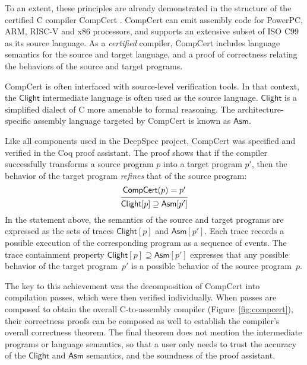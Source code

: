 \documentclass[11pt,oneside,draft]{book}
\theoremstyle{definition}
\newcommand{\kw}[1]{\ensuremath{ \mathsf{#1} }}
\begin{document}
To an extent,
these principles are already demonstrated in the structure of the
certified C compiler CompCert \citep{compcert}.
CompCert can emit assembly code
for PowerPC, ARM, RISC-V and x86 processors,
and supports an extensive subset of ISO C99
as its source language.
As a \emph{certified} compiler,
CompCert includes
language semantics for the source and target language,
and a proof of correctness relating the behaviors of
the source and target programs.

CompCert is often interfaced with source-level verification tools.
In that context,
the \kw{Clight} intermediate language
is often used as the source language.
\kw{Clight} is a simplified dialect of C
more amenable to formal reasoning.
The architecture-specific assembly language
targeted by CompCert is known as \kw{Asm}.

Like all components used in the DeepSpec project,
CompCert was specified and verified
in the Coq proof assistant.
The proof shows that if the compiler successfully transforms
a source program $p$ into a target program $p'$,
then the behavior of the target program
\emph{refines} that of the source program:
\[
  \begin{prooftree}
    \hypo{\kw{CompCert}(p) = p'}
    \infer1{\kw{Clight}[p] \supseteq \kw{Asm}[p']}
  \end{prooftree}
\]
In the statement above,
the semantics of the source and target programs
are expressed as the sets of traces
$\kw{Clight}[p]$ and $\kw{Asm}[p']$.
Each trace records a possible execution of the corresponding program
as a sequence of events.
The trace containment property
$\kw{Clight}[p] \supseteq \kw{Asm}[p']$
expresses that any possible behavior of
the target program~$p'$
is a possible behavior of the source program~$p$.

The key to this achievement
was the decomposition of CompCert
into compilation passes,
which were then verified individually.
When passes are composed to obtain the overall
C-to-assembly compiler
(Figure~\ref{fig:compcert}),
their correctness proofs can be composed as well
to establish the compiler's overall correctness theorem.
The final theorem does not mention the intermediate
programs or language semantics,
so that a user only needs to trust
the accuracy of the \kw{Clight} and \kw{Asm} semantics,
and the soundness of the proof assistant.
\end{document}
